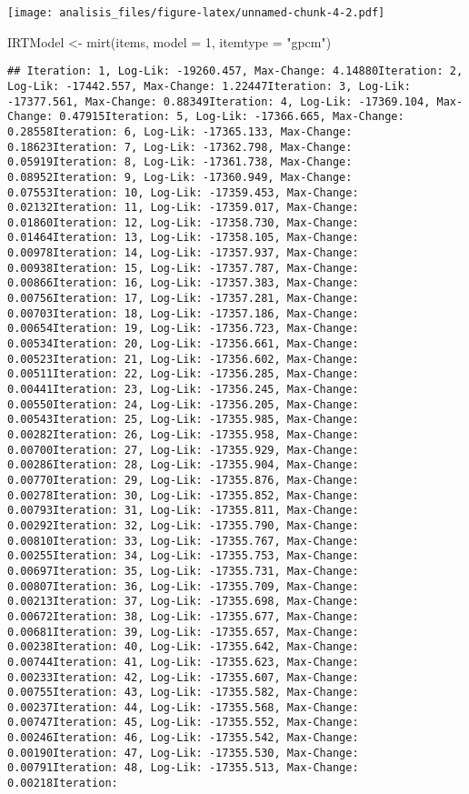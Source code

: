 \documentclass[
]{article}
\newenvironment{Shaded}{\begin{snugshade}}{\end{snugshade}}
\newcommand{\AttributeTok}[1]{\textcolor[rgb]{0.77,0.63,0.00}{#1}}
\newcommand{\DecValTok}[1]{\textcolor[rgb]{0.00,0.00,0.81}{#1}}
\newcommand{\FunctionTok}[1]{\textcolor[rgb]{0.00,0.00,0.00}{#1}}
\newcommand{\NormalTok}[1]{#1}
\newcommand{\OtherTok}[1]{\textcolor[rgb]{0.56,0.35,0.01}{#1}}
\newcommand{\StringTok}[1]{\textcolor[rgb]{0.31,0.60,0.02}{#1}}
\begin{document}
\texttt{[image: analisis\_files/figure-latex/unnamed-chunk-4-2.pdf]}

\begin{Shaded}
\begin{Highlighting}[]
\NormalTok{IRTModel }\OtherTok{\textless{}{-}} \FunctionTok{mirt}\NormalTok{(items, }\AttributeTok{model =} \DecValTok{1}\NormalTok{, }\AttributeTok{itemtype =} \StringTok{"gpcm"}\NormalTok{)}
\end{Highlighting}
\end{Shaded}

\begin{verbatim}
## Iteration: 1, Log-Lik: -19260.457, Max-Change: 4.14880Iteration: 2, Log-Lik: -17442.557, Max-Change: 1.22447Iteration: 3, Log-Lik: -17377.561, Max-Change: 0.88349Iteration: 4, Log-Lik: -17369.104, Max-Change: 0.47915Iteration: 5, Log-Lik: -17366.665, Max-Change: 0.28558Iteration: 6, Log-Lik: -17365.133, Max-Change: 0.18623Iteration: 7, Log-Lik: -17362.798, Max-Change: 0.05919Iteration: 8, Log-Lik: -17361.738, Max-Change: 0.08952Iteration: 9, Log-Lik: -17360.949, Max-Change: 0.07553Iteration: 10, Log-Lik: -17359.453, Max-Change: 0.02132Iteration: 11, Log-Lik: -17359.017, Max-Change: 0.01860Iteration: 12, Log-Lik: -17358.730, Max-Change: 0.01464Iteration: 13, Log-Lik: -17358.105, Max-Change: 0.00978Iteration: 14, Log-Lik: -17357.937, Max-Change: 0.00938Iteration: 15, Log-Lik: -17357.787, Max-Change: 0.00866Iteration: 16, Log-Lik: -17357.383, Max-Change: 0.00756Iteration: 17, Log-Lik: -17357.281, Max-Change: 0.00703Iteration: 18, Log-Lik: -17357.186, Max-Change: 0.00654Iteration: 19, Log-Lik: -17356.723, Max-Change: 0.00534Iteration: 20, Log-Lik: -17356.661, Max-Change: 0.00523Iteration: 21, Log-Lik: -17356.602, Max-Change: 0.00511Iteration: 22, Log-Lik: -17356.285, Max-Change: 0.00441Iteration: 23, Log-Lik: -17356.245, Max-Change: 0.00550Iteration: 24, Log-Lik: -17356.205, Max-Change: 0.00543Iteration: 25, Log-Lik: -17355.985, Max-Change: 0.00282Iteration: 26, Log-Lik: -17355.958, Max-Change: 0.00700Iteration: 27, Log-Lik: -17355.929, Max-Change: 0.00286Iteration: 28, Log-Lik: -17355.904, Max-Change: 0.00770Iteration: 29, Log-Lik: -17355.876, Max-Change: 0.00278Iteration: 30, Log-Lik: -17355.852, Max-Change: 0.00793Iteration: 31, Log-Lik: -17355.811, Max-Change: 0.00292Iteration: 32, Log-Lik: -17355.790, Max-Change: 0.00810Iteration: 33, Log-Lik: -17355.767, Max-Change: 0.00255Iteration: 34, Log-Lik: -17355.753, Max-Change: 0.00697Iteration: 35, Log-Lik: -17355.731, Max-Change: 0.00807Iteration: 36, Log-Lik: -17355.709, Max-Change: 0.00213Iteration: 37, Log-Lik: -17355.698, Max-Change: 0.00672Iteration: 38, Log-Lik: -17355.677, Max-Change: 0.00681Iteration: 39, Log-Lik: -17355.657, Max-Change: 0.00238Iteration: 40, Log-Lik: -17355.642, Max-Change: 0.00744Iteration: 41, Log-Lik: -17355.623, Max-Change: 0.00233Iteration: 42, Log-Lik: -17355.607, Max-Change: 0.00755Iteration: 43, Log-Lik: -17355.582, Max-Change: 0.00237Iteration: 44, Log-Lik: -17355.568, Max-Change: 0.00747Iteration: 45, Log-Lik: -17355.552, Max-Change: 0.00246Iteration: 46, Log-Lik: -17355.542, Max-Change: 0.00190Iteration: 47, Log-Lik: -17355.530, Max-Change: 0.00791Iteration: 48, Log-Lik: -17355.513, Max-Change: 0.00218Iteration: 
\end{verbatim}
\end{document}
